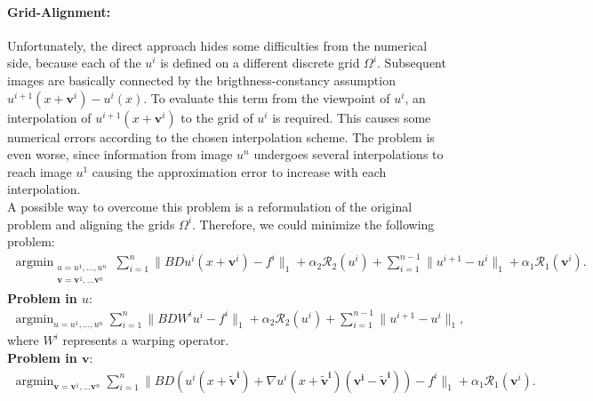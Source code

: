 \documentclass[final,leqno,onefignum,onetabnum]{article}
\newcommand{\1}[1]{\mathds{1}_{#1}}
\DeclareMathOperator*{\argmin}{\arg \min}%
\begin{document}
\paragraph{Grid-Alignment:} Unfortunately, the direct approach hides some difficulties from the numerical side, because each of the $u^i$ is defined on a different discrete grid $\Omega^i$. Subsequent images are basically connected by the brigthness-constancy assumption $u^{i+1}(x+\boldsymbol{v}^i)-u^i(x)$. To evaluate this term from the viewpoint of $u^i$, an interpolation of $u^{i+1}(x+\boldsymbol{v}^i)$ to the grid of $u^i$ is required. This causes some numerical errors according to the chosen interpolation scheme. The problem is even worse, since information from image $u^n$ undergoes several interpolations to reach image $u^1$ causing the approximation error to increase with each interpolation.\\
A possible way to overcome this problem is a reformulation of the original problem and aligning the grids $\Omega^i$. Therefore, we could minimize the following problem:
\begin{align}
\argmin_{\substack{u = u^1,\ldots, u^{n}\\\boldsymbol{v}=\boldsymbol{v}^1,\ldots\boldsymbol{v}^{n}}} \sum_{i=1}^{n} \|BDu^i(x+\boldsymbol{v}^i)-f^i \|_1 + \alpha_2 \mathcal{R}_2(u^i) + \sum_{i=1}^{n-1} \| u^{i+1} - u^i \|_1 + \alpha_1 \mathcal{R}_1(\boldsymbol{v}^i).
\label{jointLargeScaleModelAligned}
\end{align}
\textbf{Problem in $u$}:
\begin{align}
\argmin_{u = u^1,\ldots, u^{n}} \sum_{i=1}^{n} \|BDW^iu^i-f^i \|_1 + \alpha_2 \mathcal{R}_2(u^i) + \sum_{i=1}^{n-1} \| u^{i+1} - u^i \|_1
\label{jointLargeScaleModelAlignedU},
\end{align}
where $W^i$ represents a warping operator.\\
\textbf{Problem in $\boldsymbol{v}$}:
\begin{align}
\argmin_{\boldsymbol{v}=\boldsymbol{v}^1,\ldots\boldsymbol{v}^{n}} \sum_{i=1}^{n} \|BD (u^i(x+\boldsymbol{\tilde{v}^i}) + \nabla u^i(x+\boldsymbol{\tilde{v}^i})(\boldsymbol{v^i} - \boldsymbol{\tilde{v}^i})    )    -f^i \|_1 + \alpha_1 \mathcal{R}_1(\boldsymbol{v}^i).
\label{jointLargeScaleModelAligned}
\end{align}
\end{document}

